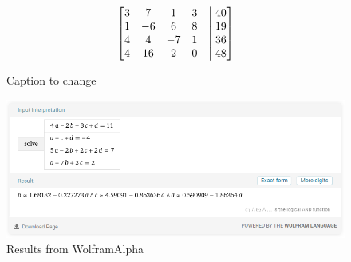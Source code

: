 \begin{figure}[htbp]
    \begin{minipage}{0.5\textwidth}
      \centering
      
    \end{minipage}%
    \begin{minipage}{0.5\textwidth}
      \centering
      $$\begin{bmatrix}
        3 & 7  & 1 & 3 &\bigm| 40 \\
        1 & -6 & 6 & 8 &\bigm| 19 \\
        4 & 4 & -7 & 1 &\bigm| 36 \\
        4 & 16 & 2 & 0 &\bigm| 48 \\
      \end{bmatrix}$$
    \end{minipage}
    \caption{Caption to change}
\end{figure}

\begin{figure}[H]
  \centering
  \includegraphics[width=14cm]{images/lineq1.png}
  \caption{Results from WolframAlpha}
  \label{fig:lineq1}
\end{figure}
